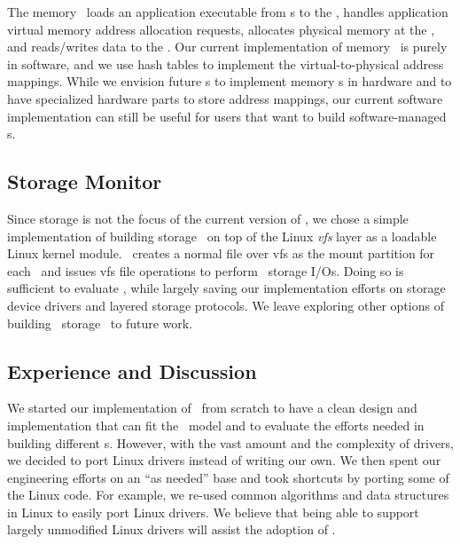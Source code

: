 The memory \microos\ loads an application executable from \scomponent{}s 
to the \mcomponent, handles application virtual memory address allocation requests,
allocates physical memory at the \mcomponent,
and reads/writes data to the \mcomponent.
Our current implementation of memory \microos\ is purely in software,
and we use hash tables to implement the virtual-to-physical address mappings.
While we envision future \mcomponent{}s to implement memory \microos{}s in hardware and
to have specialized hardware parts to store address mappings,
our current software implementation can still be useful for 
users that want to build software-managed \mcomponent{}s.

\subsection{Storage Monitor}
Since storage is not the focus of the current version of \lego,
we chose a simple implementation of building storage \microos\ on top of the Linux {\em vfs} layer as a loadable Linux kernel module.
\lego\ creates a normal file over vfs as the mount partition for each \vnode\
and issues vfs file operations to perform \lego\ storage I/Os.
Doing so is sufficient to evaluate \lego, while largely saving our implementation efforts on storage device drivers and layered storage protocols.
We leave exploring other options of building \lego\ storage \microos\ to future work.


\subsection{Experience and Discussion}
We started our implementation of \lego\ from scratch to have a clean design and implementation that 
can fit the \splitkernel\ model
and to evaluate the efforts needed in building different \microos{}s.
However, with the vast amount and the complexity of drivers, we decided to port Linux drivers
instead of writing our own.
We then spent our engineering efforts on an ``as needed'' base
and took shortcuts by porting some of the Linux code. 
For example, we re-used common algorithms and data structures in Linux to easily port Linux drivers.
We believe that being able to support largely unmodified Linux drivers
will assist the adoption of \lego.

